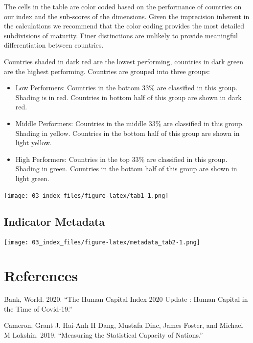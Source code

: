 \documentclass[
]{article}
\providecommand{\tightlist}{%
  \setlength{\itemsep}{0pt}\setlength{\parskip}{0pt}}
\newlength{\cslhangindent}
\newenvironment{cslreferences}%
  {\setlength{\parindent}{0pt}%
  \everypar{\setlength{\hangindent}{\cslhangindent}}\ignorespaces}%
  {\par}
\begin{document}
The cells in the table are color coded based on the performance of countries on our index and the sub-scores of the dimensions. Given the imprecision inherent in the calculations we recommend that the color coding provides the most detailed subdivisions of maturity. Finer distinctions are unlikely to provide meaningful differentiation between countries.

Countries shaded in dark red are the lowest performing, countries in dark green are the highest performing. Countries are grouped into three groups:

\begin{itemize}
\tightlist
\item
  Low Performers: Countries in the bottom 33\% are classified in this group. Shading is in red. Countries in bottom half of this group are shown in dark red.\\
\item
  Middle Performers: Countries in the middle 33\% are classified in this group. Shading in yellow. Countries in the bottom half of this group are shown in light yellow.\\
\item
  High Performers: Countries in the top 33\% are classified in this group. Shading in green. Countries in the bottom half of this group are shown in light green.
\end{itemize}

\texttt{[image: 03\_index\_files/figure-latex/tab1-1.png]}

\hypertarget{indicator-metadata}{%
\subsection{Indicator Metadata}\label{indicator-metadata}}

\texttt{[image: 03\_index\_files/figure-latex/metadata\_tab2-1.png]}

\hypertarget{references}{%
\section*{References}\label{references}}

\hypertarget{refs}{}
\begin{cslreferences}
\leavevmode\hypertarget{ref-hci2020}{}%
Bank, World. 2020. ``The Human Capital Index 2020 Update : Human Capital in the Time of Covid-19.''

\leavevmode\hypertarget{ref-cameron2019measuring}{}%
Cameron, Grant J, Hai-Anh H Dang, Mustafa Dinc, James Foster, and Michael M Lokshin. 2019. ``Measuring the Statistical Capacity of Nations.''
\end{cslreferences}
\end{document}
